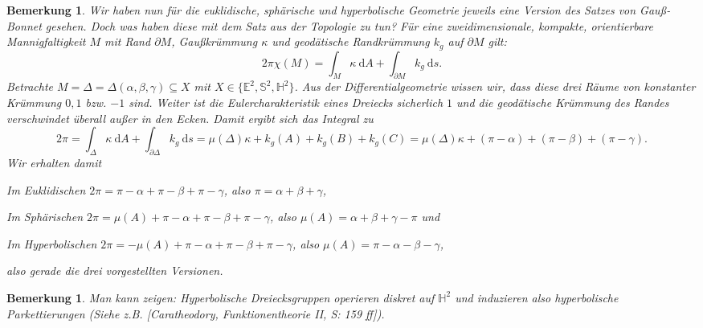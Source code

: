\documentclass[11pt]{book}
\numberwithin{dummy}{section}
\newtheorem{remark}[theorem]{Bemerkung}
\theoremstyle{nonumberbreak}
\newcommand{\E}{\mathbb{E}}
\newcommand{\Sph}{\mathbb{S}}
\newcommand{\He}{\mathbb{H}}
\begin{document}
\begin{spacing}{1.4}
\begin{remark}
Wir haben nun für die euklidische, sphärische und hyperbolische Geometrie jeweils eine Version des Satzes von Gauß-Bonnet gesehen. Doch was haben diese mit dem Satz aus der Topologie zu tun? Für eine zweidimensionale, kompakte, orientierbare Mannigfaltigkeit $M$ mit Rand $\partial M$, Gaußkrümmung $\kappa$ und geodätische Randkrümmung $k_g$ auf $\partial M$ gilt:
$$2 \pi \chi(M) = \int_M \kappa\ \mathrm{d}A + \int_{\partial M} k_g \ \mathrm{d}s.$$
Betrachte $M=\Delta=\Delta(\alpha, \beta, \gamma) \subseteq X$ mit $X\in \{\E^2, \Sph^2, \He^2\}$. Aus der Differentialgeometrie wissen wir, dass diese drei Räume von konstanter Krümmung $0,1$ bzw. $-1$ sind. Weiter ist die Eulercharakteristik eines Dreiecks sicherlich $1$ und die geodätische Krümmung des Randes verschwindet überall außer in den Ecken. Damit ergibt sich das Integral zu 
$$2\pi = \int_{\Delta} \kappa \ \mathrm{d}A + \int_{\partial \Delta} k_g \ \mathrm{d}s = \mu(\Delta) \kappa + k_g(A) + k_g(B) + k_g(C) = \mu(\Delta) \kappa + (\pi-\alpha) + (\pi-\beta) + (\pi-\gamma).$$
Wir erhalten damit
\begin{compactenum}
\item Im Euklidischen 
$2\pi = \pi - \alpha +\pi - \beta + \pi - \gamma$, also $\pi = \alpha + \beta + \gamma$,
\item Im Sphärischen $2 \pi = \mu(A) + \pi - \alpha +\pi - \beta + \pi - \gamma$, also $\mu(A)=\alpha+\beta+\gamma-\pi$ und 
\item Im Hyperbolischen $2\pi = -\mu(A)+\pi - \alpha +\pi - \beta + \pi - \gamma$, also $\mu(A) = \pi-\alpha-\beta-\gamma$,
\end{compactenum}
also gerade die drei vorgestellten Versionen.


\end{remark}




\begin{remark}
Man kann zeigen: Hyperbolische Dreiecksgruppen operieren diskret auf $\He^2$ und induzieren also hyperbolische Parkettierungen (Siehe z.B. [Caratheodory, Funktionentheorie II, S: 159 ff]).

\end{remark}






\end{spacing}
\end{document}
